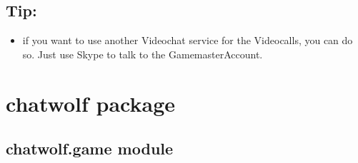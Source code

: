 \documentclass[letterpaper,10pt,english]{sphinxmanual}
\begin{document}
\section{Tip:}
\label{\detokenize{data/Readme:tip}}\begin{itemize}
\item {} 
if you want to use another Videochat service for the Videocalls, you can do so.
Just use Skype to talk to the Game\sphinxhyphen{}master\sphinxhyphen{}Account.

\end{itemize}


\chapter{chatwolf package}
\label{\detokenize{chatwolf:chatwolf-package}}\label{\detokenize{chatwolf::doc}}

\section{chatwolf.game module}
\label{\detokenize{chatwolf:module-chatwolf.game}}\label{\detokenize{chatwolf:chatwolf-game-module}}
\end{document}
